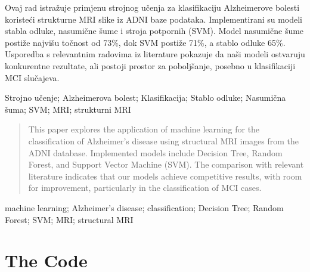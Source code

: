 \documentclass[zavrsnirad]{fer}
\begin{document}

\begin{sazetak}
	Ovaj rad istražuje primjenu strojnog učenja za klasifikaciju Alzheimerove bolesti koristeći strukturne MRI slike iz ADNI baze podataka. Implementirani su modeli stabla odluke, nasumične šume i stroja potpornih (SVM). Model nasumične šume postiže najvišu točnost od 73\%, dok SVM postiže 71\%, a stablo odluke 65\%. Usporedba s relevantnim radovima iz literature pokazuje da naši modeli ostvaruju konkurentne rezultate, ali postoji prostor za poboljšanje, posebno u klasifikaciji MCI slučajeva.
\end{sazetak}

\begin{kljucnerijeci}
	Strojno učenje; Alzheimerova bolest; Klasifikacija; Stablo odluke; Nasumična šuma; SVM; MRI; strukturni MRI
\end{kljucnerijeci}

\begin{abstract}
	This paper explores the application of machine learning for the classification of Alzheimer's disease using structural MRI images from the ADNI database. Implemented models include Decision Tree, Random Forest, and Support Vector Machine (SVM). The comparison with relevant literature indicates that our models achieve competitive results, with room for improvement, particularly in the classification of MCI cases.
\end{abstract}

\begin{keywords}
	machine learning; Alzheimer's disease; classification; Decision Tree; Random Forest; SVM; MRI; structural MRI
\end{keywords}





\backmatter

\chapter{The Code}
\end{document}
